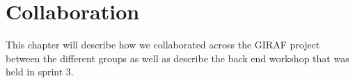 \chapter{Collaboration}
This chapter will describe how we collaborated across the GIRAF project between the different groups as well as describe the back end workshop that was held in sprint 3.